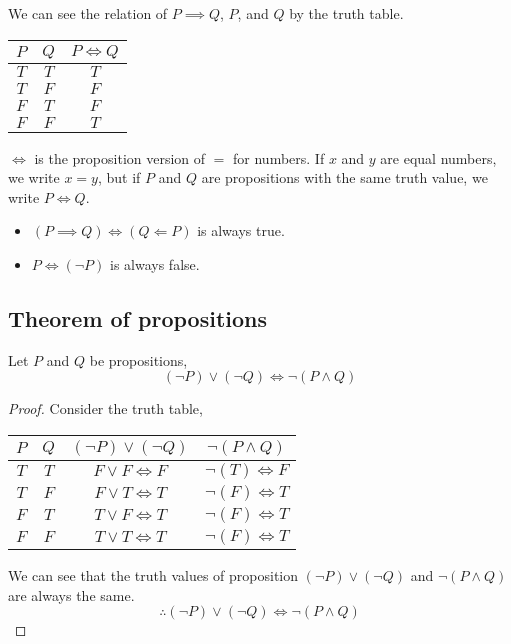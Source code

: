 \documentclass[a4paper]{article}
\begin{document}
We can see the relation of $P \implies Q$, $P$, and $Q$ by the truth table.

\begin{center}
	\begin{tabular}{|c|c|c|}
		\hline
		$P$ & $Q$ & $P \iff Q$\\
		\hline
		$T$ & $T$ & $T$\\
		\hline
		$T$ & $F$ & $F$\\
		\hline
		$F$ & $T$ & $F$\\
		\hline
		$F$ & $F$ & $T$\\
		\hline
	\end{tabular}
\end{center}

$\iff$ is the proposition version of $=$ for numbers. If $x$ and $y$ are equal numbers, we write $x = y$, but if $P$ and $Q$ are propositions with the same truth value, we write $P \iff Q$.

\begin{eg}\leavevmode
	\begin{itemize}
		\item $(P \implies Q) \iff (Q \Longleftarrow P)$ is always true.
		\item $P \iff (\neg P)$ is always false.
	\end{itemize}
\end{eg}

\subsection{Theorem of propositions}
\begin{thm}
Let $P$ and $Q$ be propositions,
$$(\lnot P) \lor (\lnot Q) \iff \lnot(P \land Q)$$
\end{thm}
\begin{proof}
Consider the truth table,
\begin{center}
	\begin{tabular}{|c|c|c|c|}
		\hline
		$P$ & $Q$ & $(\lnot P) \lor (\lnot Q)$ & $\lnot(P \land Q)$\\
		\hline
		$T$ & $T$ & $F \lor F \iff F$ & $\lnot(T) \iff F$\\
		\hline
		$T$ & $F$ & $F \lor T \iff T$ & $\lnot(F) \iff T$\\
		\hline
		$F$ & $T$ & $T \lor F \iff T$ & $\lnot(F) \iff T$\\
		\hline
		$F$ & $F$ & $T \lor T \iff T$ & $\lnot(F) \iff T$\\
		\hline
	\end{tabular}
\end{center}
We can see that the truth values of proposition $(\lnot P) \lor (\lnot Q)$ and $\lnot(P \land Q)$ are always the same.
$$\therefore (\lnot P) \lor (\lnot Q) \iff \lnot(P \land Q)$$
\end{proof}
\end{document}
